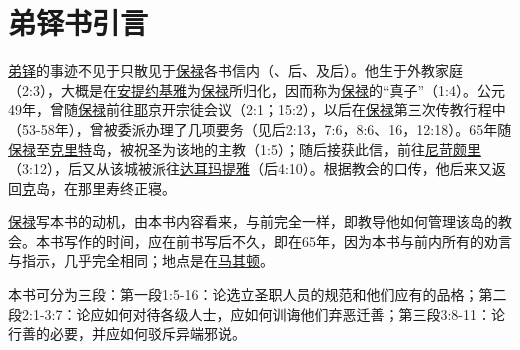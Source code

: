 \chapter*{弟铎书引言}


\uline{弟铎}的事迹不见于只散见于\uline{保禄}各书信内（、后、及后）。他生于外教家庭（2:3），大概是在\uline{安提约基}\uline{雅}为\uline{保禄}所归化，因而称为\uline{保禄}的“真子”（1:4）。公元49年，曾随\uline{保禄}前往\uline{耶}京开宗徒会议（2:1；15:2），以后在\uline{保禄}第三次传教行程中（53-58年），曾被委派办理了几项要务（见后2:13，7:6，8:6、16，12:18）。65年随\uline{保禄}至\uline{克里特}岛，被祝圣为该地的主教（1:5）；随后接获此信，前往\uline{尼苛颇里}（3:12），后又从该城被派往\uline{达耳玛提雅}（后4:10）。根据教会的口传，他后来又返回\uline{克}岛，在那里寿终正寝。

\uline{保禄}写本书的动机，由本书内容看来，与前完全一样，即教导他如何管理该岛的教会。本书写作的时间，应在前书写后不久，即在65年，因为本书与前内所有的劝言与指示，几乎完全相同；地点是在\uline{马其顿}。

本书可分为三段：第一段1:5-16：论选立圣职人员的规范和他们应有的品格；第二段2:1-3:7：论应如何对待各级人士，应如何训诲他们弃恶迁善；第三段3:8-11：论行善的必要，并应如何驳斥异端邪说。